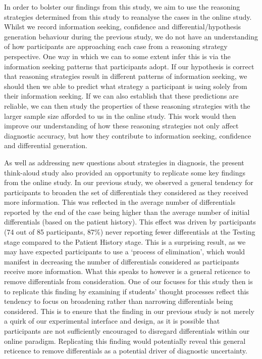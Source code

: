 \documentclass[a4paper, nobind]{templates/ociamthesis}
\begin{document}
In order to bolster our findings from this study, we aim to use the reasoning strategies determined from this study to reanalyse the cases in the online study. Whilst we record information seeking, confidence and differential/hypothesis generation behaviour during the previous study, we do not have an understanding of how participants are approaching each case from a reasoning strategy perspective. One way in which we can to some extent infer this is via the information seeking patterns that participants adopt. If our hypothesis is correct that reasoning strategies result in different patterns of information seeking, we should then we able to predict what strategy a participant is using solely from their information seeking. If we can also establish that these predictions are reliable, we can then study the properties of these reasoning strategies with the larger sample size afforded to us in the online study. This work would then improve our understanding of how these reasoning strategies not only affect diagnostic accuracy, but how they contribute to information seeking, confidence and differential generation.

\hfill\break
As well as addressing new questions about strategies in diagnosis, the present think-aloud study also provided an opportunity to replicate some key findings from the online study. In our previous study, we observed a general tendency for participants to broaden the set of differentials they considered as they received more information. This was reflected in the average number of differentials reported by the end of the case being higher than the average number of initial differentials (based on the patient history). This effect was driven by participants (74 out of 85 participants, 87\%) never reporting fewer differentials at the Testing stage compared to the Patient History stage. This is a surprising result, as we may have expected participants to use a `process of elimination', which would manifest in decreasing the number of differentials considered as participants receive more information. What this speaks to however is a general reticence to remove differentials from consideration. One of our focuses for this study then is to replicate this finding by examining if students' thought processes reflect this tendency to focus on broadening rather than narrowing differentials being considered. This is to ensure that the finding in our previous study is not merely a quirk of our experimental interface and design, as it is possible that participants are not sufficiently encouraged to disregard differentials within our online paradigm. Replicating this finding would potentially reveal this general reticence to remove differentials as a potential driver of diagnostic uncertainty.
\end{document}
